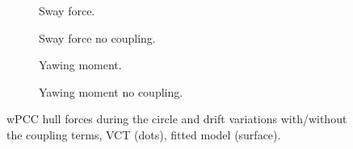\begin{figure}[h]
     \centering
     \begin{subfigure}[b]{0.49\textwidth}
         \centering
         
        \caption{Sway force.}
        \label{fig:circle_drift_Y_H_wPCC}
     \end{subfigure}
     \hfill
     \begin{subfigure}[b]{0.49\textwidth}
         \centering
         
        \caption{Sway force no coupling.}
        \label{fig:circle_drift_Y_H_no_coupling_wPCC}
     \end{subfigure}

     \vfill
     \begin{subfigure}[b]{0.49\textwidth}
         \centering
         
        \caption{Yawing moment.}
        \label{fig:circle_drift_N_H_wPCC}
     \end{subfigure}
     \hfill
     \begin{subfigure}[b]{0.49\textwidth}
         \centering
         
        \caption{Yawing moment no coupling.}
        \label{fig:circle_drift_N_H_no_coupling_wPCC}
     \end{subfigure}
     
    \caption{wPCC hull forces during the circle and drift variations with/without the coupling terms, VCT (dots), fitted model (surface).}
    \label{fig:circle_drift_wPCC}
\end{figure}






